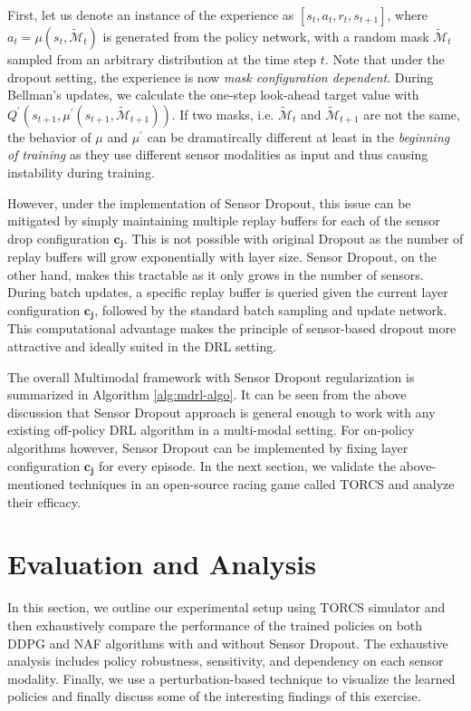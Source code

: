 \documentclass[../thesis.tex]{subfiles}
\begin{document}
First, let us denote an instance of the experience as $[s_{t}, a_{t} , r_{t}, s_{t+1}]$, where $a_{t} = \mu(s_t, \mathcal{\tilde{M}}_{t}) $ is generated from the policy network, with a random mask $\mathcal{\tilde{M}}_{t}$ sampled from an arbitrary distribution at the time step $t$. Note that under the dropout setting, the experience is now \textit{mask configuration dependent}. During Bellman's updates, we calculate the one-step look-ahead target value with $Q^{'}(s_{t+1}, \mu^{'}(s_{t+1},\mathcal{\tilde{M}}_{t+1}))$. 
If two masks, i.e. $\mathcal{\tilde{M}}_{t}$ and $\mathcal{\tilde{M}}_{t+1}$ are not the same, the behavior of $\mu$ and $\mu^{'}$ can be dramatircally different at least in the \textit{beginning of training} as they use different sensor modalities as input and thus causing instability during training.

However, under the implementation of Sensor Dropout, this issue can be mitigated by simply maintaining multiple replay buffers for each of the sensor drop configuration $\mathbf{c_j}$. This is not possible with original Dropout as the number of replay buffers will grow exponentially with layer size. Sensor Dropout, on the other hand, makes this tractable as it only grows in the number of sensors. During batch updates, a specific replay buffer is queried given the current layer configuration $\mathbf{c_j}$, followed by the standard batch sampling and update network. This computational advantage makes the principle of sensor-based dropout more attractive and ideally suited in the DRL setting. 

The overall Multimodal framework with Sensor Dropout regularization is summarized in Algorithm \ref{alg:mdrl-algo}. It can be seen from the above discussion that Sensor Dropout approach is general enough to work with any existing off-policy DRL algorithm in a multi-modal setting. For on-policy algorithms however, Sensor Dropout can be implemented by fixing layer configuration $\mathbf{c_j}$ for every episode. In the next section, we validate the above-mentioned techniques in an open-source racing game called TORCS \cite{wymann2000torcs} and analyze their efficacy.



\section{Evaluation and Analysis} \label{sec:mdrl-results}
In this section, we outline our experimental setup using TORCS simulator and then exhaustively compare the performance of the trained policies on both DDPG and NAF algorithms with and without Sensor Dropout. The exhaustive analysis includes policy robustness, sensitivity, and dependency on each sensor modality. Finally, we use a perturbation-based technique to visualize the learned policies and finally discuss some of the interesting findings of this exercise.
\end{document}
